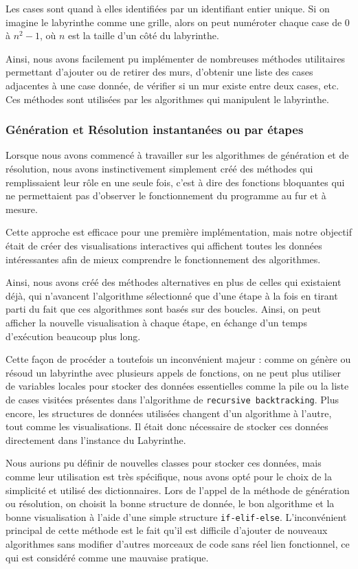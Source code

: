 \documentclass[12pt]{scrreprt} %
\begin{document}
Les cases sont quand à elles identifiées par un identifiant entier unique. Si on imagine le labyrinthe comme une grille, alors on peut numéroter chaque case de $0$ à $n^2 - 1$, où $n$ est la taille d'un côté du labyrinthe.

Ainsi, nous avons facilement pu implémenter de nombreuses méthodes utilitaires permettant d'ajouter ou de retirer des murs, d'obtenir une liste des cases adjacentes à une case donnée, de vérifier si un mur existe entre deux cases, etc. Ces méthodes sont utilisées par les algorithmes qui manipulent le labyrinthe.

\subsubsection{Génération et Résolution instantanées ou par étapes}

Lorsque nous avons commencé à travailler sur les algorithmes de génération et de résolution, nous avons instinctivement simplement créé des méthodes qui remplissaient leur rôle en une seule fois, c'est à dire des fonctions bloquantes qui ne permettaient pas d'observer le fonctionnement du programme au fur et à mesure.

Cette approche est efficace pour une première implémentation, mais notre objectif était de créer des visualisations interactives qui affichent toutes les données intéressantes afin de mieux comprendre le fonctionnement des algorithmes.

Ainsi, nous avons créé des méthodes alternatives en plus de celles qui existaient déjà, qui n'avancent l'algorithme sélectionné que d'une étape à la fois en tirant parti du fait que ces algorithmes sont basés sur des boucles. Ainsi, on peut afficher la nouvelle visualisation à chaque étape, en échange d'un temps d'exécution beaucoup plus long.

Cette façon de procéder a toutefois un inconvénient majeur : comme on génère ou résoud un labyrinthe avec plusieurs appels de fonctions, on ne peut plus utiliser de variables locales pour stocker des données essentielles comme la pile ou la liste de cases visitées présentes dans l'algorithme de \texttt{recursive backtracking}. Plus encore, les structures de données utilisées changent d'un algorithme à l'autre, tout comme les visualisations. Il était donc nécessaire de stocker ces données directement dans l'instance du Labyrinthe.

Nous aurions pu définir de nouvelles classes pour stocker ces données, mais comme leur utilisation est très spécifique, nous avons opté pour le choix de la simplicité et utilisé des dictionnaires. Lors de l'appel de la méthode de génération ou résolution, on choisit la bonne structure de donnée, le bon algorithme et la bonne visualisation à l'aide d'une simple structure \texttt{if-elif-else}. L'inconvénient principal de cette méthode est le fait qu'il est difficile d'ajouter de nouveaux algorithmes sans modifier d'autres morceaux de code sans réel lien fonctionnel, ce qui est considéré comme une mauvaise pratique.
\end{document}
